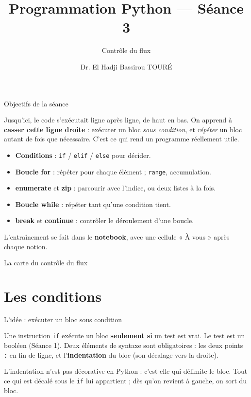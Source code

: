 \documentclass[aspectratio=169,11pt]{beamer}
\title{Programmation Python — Séance 3}
\subtitle{Contrôle du flux}
\author{Dr. El Hadji Bassirou TOURÉ}
\institute{Département de Mathématiques et Informatique\\ Faculté des Sciences et Techniques\\ Université Cheikh Anta Diop de Dakar}
\date{}
\begin{document}
\begin{frame}\titlepage\end{frame}

\begin{frame}{Objectifs de la séance}
\begin{ucaddef}[Contenu]
{\small Jusqu'ici, le code s'exécutait ligne après ligne, de haut en bas. On apprend à \textbf{casser cette ligne droite} : exécuter un bloc \emph{sous condition}, et \emph{répéter} un bloc autant de fois que nécessaire. C'est ce qui rend un programme réellement utile.}
\end{ucaddef}
\begin{itemize}\small
  \item \textbf{Conditions} : \texttt{if} / \texttt{elif} / \texttt{else} pour décider.
  \item \textbf{Boucle for} : répéter pour chaque élément ; \texttt{range}, accumulation.
  \item \textbf{enumerate} et \textbf{zip} : parcourir avec l'indice, ou deux listes à la fois.
  \item \textbf{Boucle while} : répéter tant qu'une condition tient.
  \item \textbf{break} et \textbf{continue} : contrôler le déroulement d'une boucle.
\end{itemize}
{\small L'entraînement se fait dans le \textbf{notebook}, avec une cellule « À vous » après chaque notion.}
\end{frame}

\begin{frame}{La carte du contrôle du flux}
\end{frame}

\section{Les conditions}

\begin{frame}{L'idée : exécuter un bloc sous condition}
\begin{ucaddef}
{\small Une instruction \texttt{if} exécute un bloc \textbf{seulement si} un test est vrai. Le test est un booléen (Séance 1). Deux éléments de syntaxe sont obligatoires : les deux points \texttt{:} en fin de ligne, et l'\textbf{indentation} du bloc (son décalage vers la droite).}
\end{ucaddef}
{\small L'indentation n'est pas décorative en Python : c'est elle qui délimite le bloc. Tout ce qui est décalé sous le \texttt{if} lui appartient ; dès qu'on revient à gauche, on sort du bloc.}
\end{frame}
\end{document}
